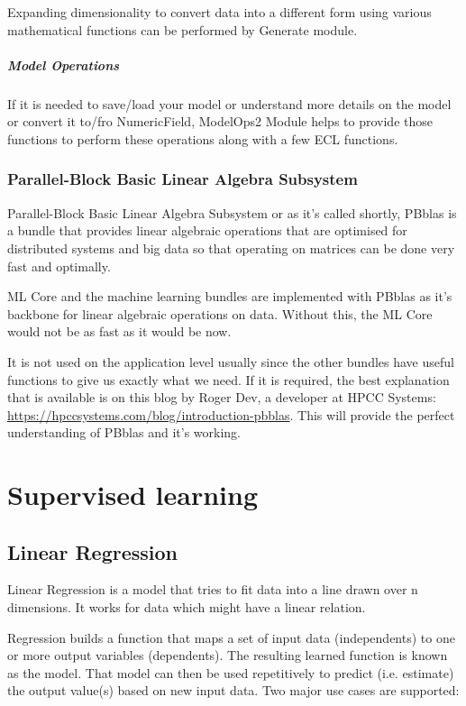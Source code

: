 Expanding dimensionality to convert data into a different form using various mathematical functions can be performed by Generate module.

\subsubsection{Model Operations}

If it is needed to save/load your model or understand more details on the model or convert it to/fro NumericField, ModelOps2 Module helps to provide those functions to perform these operations along with a few ECL functions.

\section{Parallel-Block Basic Linear Algebra Subsystem}\label{sec:pbblas}

Parallel-Block Basic Linear Algebra Subsystem or as it's called shortly, PBblas is a bundle that provides linear algebraic operations that are optimised for distributed systems and big data so that operating on matrices can be done very fast and optimally. 

ML Core and the machine learning bundles are implemented with PBblas as it's backbone for linear algebraic operations on data. Without this, the ML Core would not be as fast as it would be now. 

It is not used on the application level usually since the other bundles have useful functions to give us exactly what we need. If it is required, the best explanation that is available is on this blog by Roger Dev, a developer at HPCC Systems: \url{https://hpccsystems.com/blog/introduction-pbblas}. This will provide the perfect understanding of PBblas and it's working.

\part{Supervised learning}\label{part:supe}

\chapter{Linear Regression}\label{supe:linreg}

Linear Regression is a model that tries to fit data into a line drawn over n dimensions. It works for data which might have a linear relation.

Regression builds a function that maps a set of input data (independents) to one or more output variables (dependents). The resulting learned function is known as the model. That model can then be used repetitively to predict (i.e. estimate) the output value(s) based on new input data. Two major use cases are supported:

